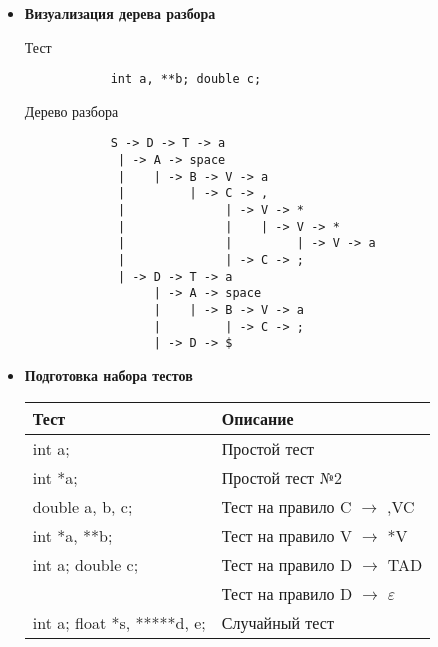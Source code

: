 \documentclass[12pt]{article}
\begin{document}
\begin{itemize}
	\item \textbf{Визуализация дерева разбора}

		Тест
		\begin{verbatim}				
			int a, **b; double c; 
		\end{verbatim}				

		Дерево разбора
		\begin{verbatim}				
			S -> D -> T -> a
		     | -> A -> space
		     |    | -> B -> V -> a
		     |         | -> C -> ,
		     |              | -> V -> *
		     |              |    | -> V -> *
		     |              |         | -> V -> a
		     |              | -> C -> ;
		     | -> D -> T -> a
		          | -> A -> space
		          |    | -> B -> V -> a
		          |         | -> C -> ;
		          | -> D -> $
		\end{verbatim}				

	\item \textbf{Подготовка набора тестов}

		\begin{tabular} {|l|l|}
			\hline
				\textbf{Тест} & \textbf{Описание}\\
			\hline
				int a; & Простой тест \\
			\hline
				int *a; & Простой тест №2 \\
			\hline
				double a, b, c; & Тест на правило C $\rightarrow$ ,VC \\
			\hline
				int *a, **b; & Тест на правило V $\rightarrow$ *V \\
			\hline
				int a; double c; & Тест на правило D $\rightarrow$ TAD \\
			\hline
				  & Тест на правило D $\rightarrow$ $\varepsilon$ \\
			\hline
				int a; float *s, *****d, e; & Случайный тест \\
			\hline
		\end{tabular}


\end{itemize}
\end{document}
